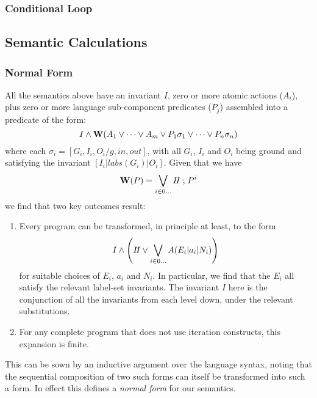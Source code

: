 \subsubsection{Conditional Loop}




\newpage
\subsection{Semantic Calculations}

\subsubsection{Normal Form}

All the semantics above have an invariant $I$,
zero or more atomic actions ($A_i$),
plus zero or more language sub-component predicates ($P_j$)
assembled into a predicate of the form:
\[
  I
  \land
  \mathbf{W}( A_1 \lor \dots \lor A_m
     \lor
     P_1\sigma_1 \lor \dots \lor P_n\sigma_n )
\]
where each $\sigma_i = [G_i,I_i,O_i/g,in,out]$,
with all $G_i$, $I_i$ and $O_i$ being ground
and satisfying the invariant $[I_i|labs(G_i)|O_i]$.
Given that we have
\[
  \mathbf{W}(P) = \bigvee_{i \in 0\dots} I\!I \mathrel{;} P^i
\]
we find that two key outcomes result:
\begin{enumerate}
  \item
    Every program can be transformed,
    in principle at least,
    to the form
    \[
     I \land \left( I\!I \lor \bigvee_{i \in 0\dots}  A(E_i|a_i|N_i) \right)
    \]
    for suitable choices of $E_i$, $a_i$ and $N_i$.
    In particular, we find that the $E_i$ all satisfy the relevant
    label-set invariants.
    The invariant $I$ here is the conjunction of all the invariants
    from each level down, under the relevant substitutions.
  \item
    For any complete program that does not use iteration constructs,
    this expansion is finite.
\end{enumerate}
This can be sown by an inductive argument over the language syntax,
noting that the sequential composition of two such forms
can itself be transformed into such a form.
In effect this defines a \emph{normal form} for our semantics.

